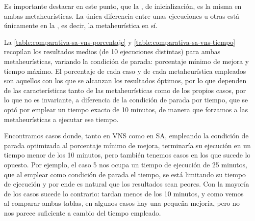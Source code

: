 Es importante destacar en este punto, que la \faseuno{}, de inicialización, es la misma en ambas metaheurísticas. La única diferencia entre unas ejecuciones u otras está únicamente en la \fasedos{}, es decir, la metaheurística en sí.

La \autoref{table:comparativa-sa-vns-porcentaje} y \ref{table:comparativa-sa-vns-tiempo} recopilan los resultados medios (de 10 ejecuciones distintas) para ambas metaheurísticas, variando la condición de parada: porcentaje mínimo de mejora y tiempo máximo. El porcentaje de cada caso y de cada metaheurística empleados son aquellos con los que se alcanzan los resultados óptimos, por lo que dependen de las características tanto de las metaheurísticas como de los propios casos, por lo que no es invariante, a diferencia de la condición de parada por tiempo, que se optó por emplear un tiempo exacto de 10 minutos, de manera que forzamos a las metaheurísticas a ejecutar ese tiempo. 

Encontramos casos donde, tanto en VNS como en SA, empleando la condición de parada optimizada al porcentaje mínimo de mejora, terminaría su ejecución en un tiempo menor de los 10 minutos, pero también tenemos casos en los que sucede lo opuesto. Por ejemplo, el caso 5 nos ocupa un tiempo de ejecución de 25 minutos, que al emplear como condición de parada el tiempo, se está limitando su tiempo de ejecución y por ende es natural que los resultados sean peores. Con la mayoría de los casos sucede lo contrario: tardan menos de los 10 minutos, y como vemos al comparar ambas tablas, en algunos casos hay una pequeña mejoría, pero no nos parece suficiente a cambio del tiempo empleado.

